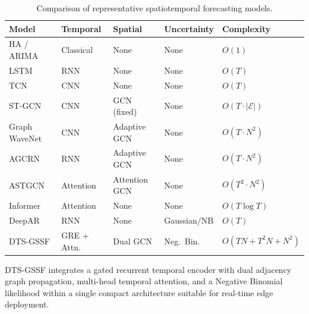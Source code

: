 \begin{table}[H]
\centering
\caption{Comparison of representative spatiotemporal forecasting models.}
\label{Tab.comparison}
\small
\begin{tabular}{@{}lllll@{}}
\toprule
Model & Temporal & Spatial & Uncertainty & Complexity \\
\midrule
HA / ARIMA & Classical & None & None & $O(1)$ \\
LSTM \cite{hochreiter1997long} & RNN & None & None & $O(T)$ \\
TCN \cite{bai2018empirical} & CNN & None & None & $O(T)$ \\
ST-GCN \cite{yu2018stgcn} & CNN & GCN (fixed) & None & $O(T \cdot |\mathcal{E}|)$ \\
Graph WaveNet \cite{wu2019graphwavenet} & CNN & Adaptive GCN & None & $O(T \cdot N^2)$ \\
AGCRN \cite{bai2020adaptive} & RNN & Adaptive GCN & None & $O(T \cdot N^2)$ \\
ASTGCN \cite{guo2019astgcn} & Attention & Attention GCN & None & $O(T^2 \cdot N^2)$ \\
Informer \cite{zhou2021informer} & Attention & None & None & $O(T \log T)$ \\
DeepAR \cite{salinas2020deepar} & RNN & None & Gaussian/NB & $O(T)$ \\
\midrule
DTS-GSSF & GRE + Attn. & Dual GCN & Neg.\ Bin. & $O(TN + T^2N + N^2)$ \\
\bottomrule
\end{tabular}
\end{table}

DTS-GSSF integrates a gated recurrent temporal encoder with dual adjacency graph propagation, multi-head temporal attention, and a Negative Binomial likelihood within a single compact architecture suitable for real-time edge deployment.

